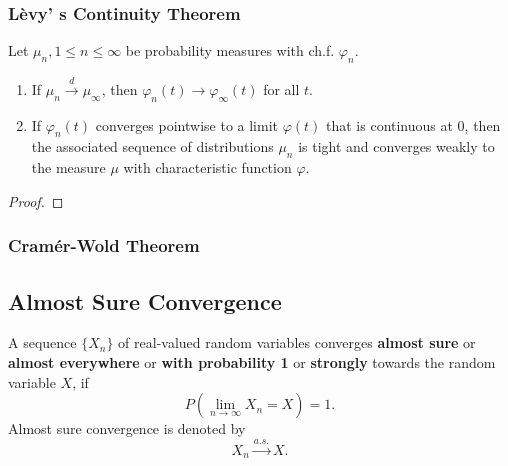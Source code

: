 \subsubsection{L\`evy' s Continuity Theorem}

\begin{theorem}
	Let $\mu_{n},1\leq n\leq\infty$ be probability measures with ch.f. $\varphi_{n}$.
	\begin{enumerate}
		\item If $\mu_{n}\stackrel{d}{\rightarrow}\mu_{\infty}$, then $\varphi_{n}(t)\rightarrow\varphi_{\infty}(t)$ for all $t$.
		\item If $\varphi_{n}(t)$ converges pointwise to a limit $\varphi(t)$ that is continuous at $0$, then the associated sequence of distributions $\mu_{n}$ is tight and converges weakly to the measure $\mu$ with characteristic function $\varphi$.
	\end{enumerate}
\end{theorem}

\begin{proof}

\end{proof}

\subsubsection{Cram\'er-Wold Theorem}

\begin{theorem} \label{thm:cramer-wold-theorem}

\end{theorem}

\subsection{Almost Sure Convergence}

\begin{definition}
	A sequence $\{X_n\}$ of real-valued random variables converges \textbf{almost sure} or \textbf{almost everywhere} or \textbf{with probability 1} or \textbf{strongly} towards the random variable $X$, if
	\begin{equation}
		P\left(\lim_{n\to\infty}X_n=X\right)=1.
	\end{equation}
	Almost sure convergence is denoted by
	\begin{equation}
		X_n \stackrel{a.s.}{\rightarrow} X.
	\end{equation}
\end{definition}

